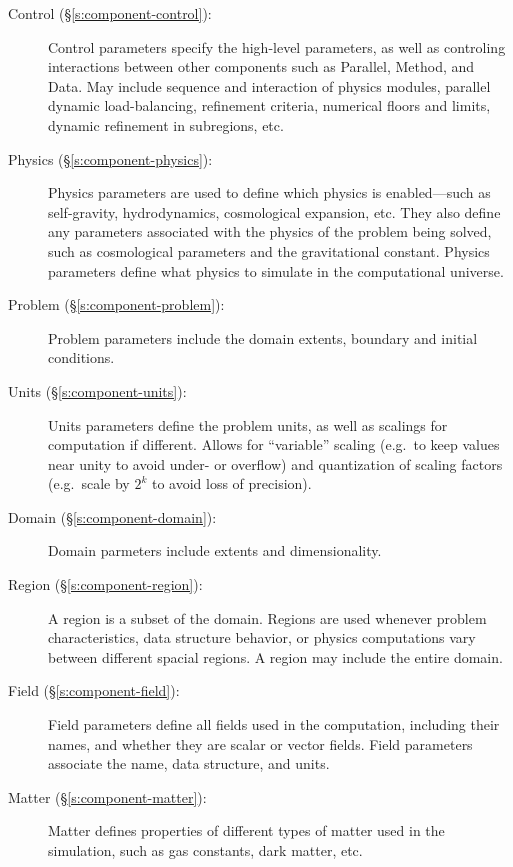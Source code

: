 \begin{description}

 \item [Control (\S\ref{s:component-control}): ] Control parameters specify the
 high-level parameters, as well as controling interactions between
 other components such as Parallel, Method, and Data.  May
 include sequence and interaction of physics modules, parallel dynamic
 load-balancing, refinement criteria, numerical floors and limits,
 dynamic refinement in subregions, etc.

 \item [Physics (\S\ref{s:component-physics}): ] Physics parameters are used to
 define which physics is enabled---such as self-gravity,
 hydrodynamics, cosmological expansion, etc.  They also define any
 parameters associated with the physics of the problem being solved,
 such as cosmological parameters and the gravitational constant.
 Physics parameters define what physics to simulate in the
 computational universe.

 \item [Problem (\S\ref{s:component-problem}): ] Problem parameters include
 the domain extents, boundary and initial conditions.

 \item [Units (\S\ref{s:component-units}): ] Units parameters define the problem
 units, as well as scalings for computation if different.  Allows for
 ``variable'' scaling (e.g.~to keep values near unity to avoid under-
 or overflow) and quantization of scaling factors (e.g.~scale by $2^k$
 to avoid loss of precision).

 \item [Domain (\S\ref{s:component-domain}): ] Domain parmeters include extents
 and dimensionality.

 \item [Region (\S\ref{s:component-region}): ] A region is a subset of the
 domain.  Regions are used whenever problem characteristics,
 data structure behavior, or physics computations vary between
 different spacial regions.  A region may include the entire
 domain.

 \item [Field (\S\ref{s:component-field}): ] Field parameters define all fields
 used in the computation, including their names, and whether they are
 scalar or vector fields.  Field parameters associate the name,
 data structure, and units.

 \item [Matter (\S\ref{s:component-matter}): ] Matter defines properties of
 different types of matter used in the simulation, such as gas
 constants, dark matter, etc.


\end{description}
